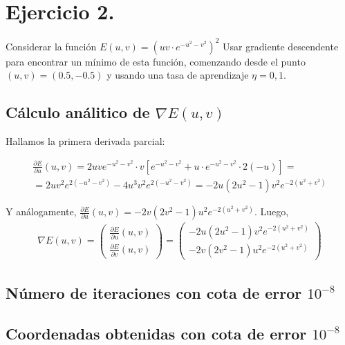 \section{Ejercicio 2.}
Considerar la función $E(u, v) = \left( u v \cdot e^{ -u^2 -v^2 } \right) ^2$
Usar gradiente descendente para encontrar un mínimo de esta función, comenzando
desde el punto $(u, v) = (0.5, -0.5)$ y usando una tasa de aprendizaje $\eta = 0,1$.

\subsection{Cálculo análitico de \texorpdfstring{$\nabla E(u, v)$}{Lg}}

Hallamos la primera derivada parcial: 

\begin{equation}
\begin{aligned}
  \frac{\partial{E}}{\partial u}(u,v) = 2uve^{-u^2 - v^2} \cdot v \left[ e^{-u^2 - v^2} + u\cdot e^{-u^2 - v^2} \cdot 2(-u) \right] = \\
  = 2uv^2e^{2(-u^2-v^2)} - 4u^3v^2e^{2(-u^2-v^2)} = -2u (2u^2 - 1) v^2 e^{-2(u^2+v^2)}
\end{aligned}
\end{equation}

Y análogamente, $\frac{\partial{E}}{\partial u}(u,v) = -2v (2v^2 - 1) u^2 e^{-2(u^2+v^2)}$. Luego, 
\begin{equation}
  \begin{aligned}
    \nabla{E}(u,v) = \begin{pmatrix}
           \frac{\partial E}{\partial u}(u,v) \\
           \frac{\partial E}{\partial v}(u,v) 
    \end{pmatrix}  =  \begin{pmatrix}
          -2u (2u^2 - 1) v^2 e^{-2(u^2+v^2)} \\
          -2v (2v^2 - 1) u^2 e^{-2(u^2+v^2)}
    \end{pmatrix}
  \end{aligned}
\end{equation}


\subsection{Número de iteraciones con cota de error \texorpdfstring{$10^{-8}$}{Lg}}
\subsection{Coordenadas obtenidas con cota de error \texorpdfstring{$10^{-8}$}{Lg}}

